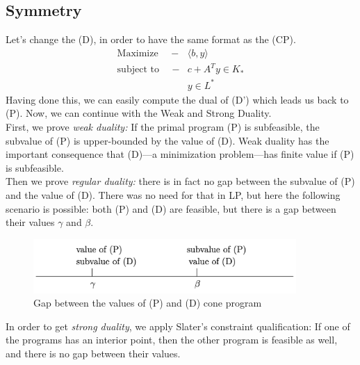 \documentclass[12pt]{article}
\begin{document}
	\subsection{Symmetry}
   	Let's change the (D), in order to have the same format as the (CP).
   	\begin{align*}
    \text{Maximize } \quad  -&\langle b,y \rangle \\
     \text{subject to } \quad  -&c + A^Ty \in K_* 
     \tag{D}
     \\
 	&y \in L^*   			
   	\end{align*}
	Having done this, we can easily compute the dual of (D') which leads us back to (P). Now, we can continue with the Weak and Strong Duality.   \\First, we prove \textit{weak duality:} If the primal program (P) is subfeasible, the subvalue of (P) is upper-bounded by the value of (D). Weak duality has the important consequence that (D)—a minimization problem—has finite value if (P) is subfeasible. \\
	Then we prove \textit{regular duality:} there is in fact no gap between the subvalue of (P) and the value of (D). There was no need for that in LP, but here the following scenario is possible: both (P) and (D) are feasible, but there is a gap between their values $\gamma$ and $\beta$.
	\begin{figure}[ht]
	\begin{center}
  		\includegraphics[width=10cm]{fig2.png}
  		\caption{Gap between the values of (P) and (D) cone program}
	  \end{center}
\end{figure} \newpage
In order to get \textit{strong duality}, we apply Slater’s constraint qualification: If one of the programs has an interior point, then the other program is feasible as well, and there is no gap between their values.	
    
\end{document}
